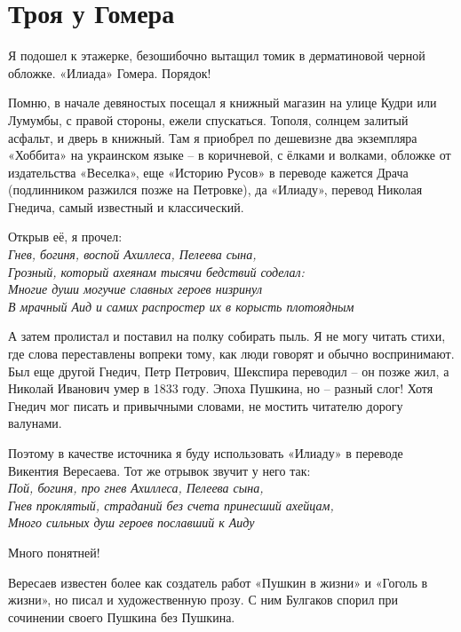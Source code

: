 \chapter{Троя у Гомера}

Я подошел к этажерке, безошибочно вытащил томик в дерматиновой черной обложке. «Илиада» Гомера. Порядок!

Помню, в начале девяностых посещал я книжный магазин на улице Кудри или Лумумбы, с правой стороны, ежели спускаться. Тополя, солнцем залитый асфальт, и дверь в книжный. Там я приобрел по дешевизне два экземпляра «Хоббита» на украинском языке – в коричневой, с ёлками и волками, обложке от издательства «Веселка», еще «Историю Русов» в переводе кажется Драча (подлинником разжился позже на Петровке), да «Илиаду», перевод Николая Гнедича, самый известный и классический. 

Открыв её, я прочел:\\

\noindent
\textit{Гнев, богиня, воспой Ахиллеса, Пелеева сына,\\
Грозный, который ахеянам тысячи бедствий соделал:\\
Многие души могучие славных героев низринул\\
В мрачный Аид и самих распростер их в корысть плотоядным\\}

А затем пролистал и поставил на полку собирать пыль. Я не могу читать стихи, где слова переставлены вопреки тому, как люди говорят и обычно воспринимают. Был еще другой Гнедич, Петр Петрович, Шекспира переводил – он позже жил, а Николай Иванович умер в 1833 году. Эпоха Пушкина, но – разный слог! Хотя Гнедич мог писать и привычными словами, не мостить читателю дорогу валунами.

Поэтому в качестве источника я буду использовать «Илиаду» в переводе Викентия Вересаева. Тот же отрывок звучит у него так:\\

\noindent
\textit{Пой, богиня, про гнев Ахиллеса, Пелеева сына,\\
Гнев проклятый, страданий без счета принесший ахейцам,\\
Много сильных душ героев пославший к Аиду\\}

Много понятней!

Вересаев известен более как создатель работ «Пушкин в жизни» и «Гоголь в жизни», но писал и художественную прозу. С ним Булгаков спорил при сочинении своего Пушкина без Пушкина.

